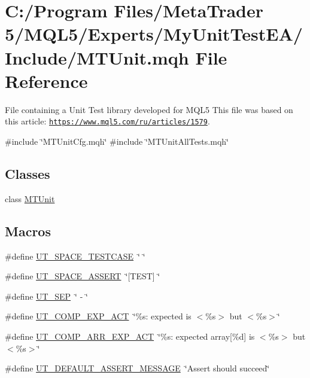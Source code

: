 \hypertarget{_m_t_unit_8mqh}{}\section{C\+:/\+Program Files/\+Meta\+Trader 5/\+M\+Q\+L5/\+Experts/\+My\+Unit\+Test\+E\+A/\+Include/\+M\+T\+Unit.mqh File Reference}
\label{_m_t_unit_8mqh}


File containing a Unit Test library developed for M\+Q\+L5 This file was based on this article\+: \href{https://www.mql5.com/ru/articles/1579}{\tt https\+://www.\+mql5.\+com/ru/articles/1579}.  


{\ttfamily \#include \char`\"{}M\+T\+Unit\+Cfg.\+mqh\char`\"{}}\newline
{\ttfamily \#include \char`\"{}M\+T\+Unit\+All\+Tests.\+mqh\char`\"{}}\newline
\subsection*{Classes}
\begin{DoxyCompactItemize}
\item 
class \mbox{\hyperlink{class_m_t_unit}{M\+T\+Unit}}
\end{DoxyCompactItemize}
\subsection*{Macros}
\begin{DoxyCompactItemize}
\item 
\#define \mbox{\hyperlink{_m_t_unit_8mqh_abec0187655f13dec59b96cde105e5bc1}{U\+T\+\_\+\+S\+P\+A\+C\+E\+\_\+\+T\+E\+S\+T\+C\+A\+SE}}~\char`\"{}  \char`\"{}
\item 
\#define \mbox{\hyperlink{_m_t_unit_8mqh_a41d9aa881079f30c8488682ba6a90014}{U\+T\+\_\+\+S\+P\+A\+C\+E\+\_\+\+A\+S\+S\+E\+RT}}~\char`\"{}\mbox{[}T\+E\+ST\mbox{]} \char`\"{}
\item 
\#define \mbox{\hyperlink{_m_t_unit_8mqh_a4631b5eea3d8e74cd319ef46940fb539}{U\+T\+\_\+\+S\+EP}}~\char`\"{} -\/ \char`\"{}
\item 
\#define \mbox{\hyperlink{_m_t_unit_8mqh_a6369f0c6469a39ec1afa8834e8a96733}{U\+T\+\_\+\+C\+O\+M\+P\+\_\+\+E\+X\+P\+\_\+\+A\+CT}}~\char`\"{}\%s\+: expected is $<$\%s$>$ but $<$\%s$>$\char`\"{}
\item 
\#define \mbox{\hyperlink{_m_t_unit_8mqh_afdcc024902d14669b7a22158e646299b}{U\+T\+\_\+\+C\+O\+M\+P\+\_\+\+A\+R\+R\+\_\+\+E\+X\+P\+\_\+\+A\+CT}}~\char`\"{}\%s\+: expected array\mbox{[}\%d\mbox{]} is $<$\%s$>$ but $<$\%s$>$\char`\"{}
\item 
\#define \mbox{\hyperlink{_m_t_unit_8mqh_a96f5d62188d09039ebc3f443c9120e39}{U\+T\+\_\+\+D\+E\+F\+A\+U\+L\+T\+\_\+\+A\+S\+S\+E\+R\+T\+\_\+\+M\+E\+S\+S\+A\+GE}}~\char`\"{}Assert should succeed\char`\"{}
\end{DoxyCompactItemize}
